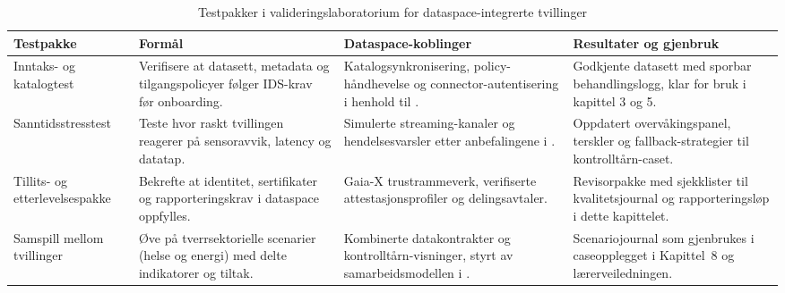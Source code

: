 \begin{table}[htbp]
    \centering
    \caption{Testpakker i valideringslaboratorium for dataspace-integrerte tvillinger}
    \label{tab:dataspace-lab}
    \begin{tabular}{|p{3.4cm}|p{4.6cm}|p{4.6cm}|p{2.8cm}|}
        \hline
        \textbf{Testpakke} & \textbf{Formål} & \textbf{Dataspace-koblinger} & \textbf{Resultater og gjenbruk} \\
        \hline
        Inntaks- og katalogtest & Verifisere at datasett, metadata og tilgangspolicyer følger IDS-krav før onboarding. & Katalogsynkronisering, policy-håndhevelse og connector-autentisering i henhold til \citet{idsa2023operational}. & Godkjente datasett med sporbar behandlingslogg, klar for bruk i kapittel 3 og 5. \\
        \hline
        Sanntidsstresstest & Teste hvor raskt tvillingen reagerer på sensoravvik, latency og datatap. & Simulerte streaming-kanaler og hendelsesvarsler etter anbefalingene i \citet{digdir2024sanntidsdata}. & Oppdatert overvåkingspanel, terskler og fallback-strategier til kontrolltårn-caset. \\
        \hline
        Tillits- og etterlevelsespakke & Bekrefte at identitet, sertifikater og rapporteringskrav i dataspace oppfylles. & Gaia-X trustrammeverk, verifiserte attestasjonsprofiler og delingsavtaler.\citep{gaiax2023architecture} & Revisorpakke med sjekklister til kvalitetsjournal og rapporteringsløp i dette kapittelet. \\
        \hline
        Samspill mellom tvillinger & Øve på tverrsektorielle scenarier (helse og energi) med delte indikatorer og tiltak. & Kombinerte datakontrakter og kontrolltårn-visninger, styrt av samarbeidsmodellen i \citet{sintef2021digital}. & Scenariojournal som gjenbrukes i caseopplegget i Kapittel~8 og lærerveiledningen. \\
        \hline
    \end{tabular}
\end{table}

